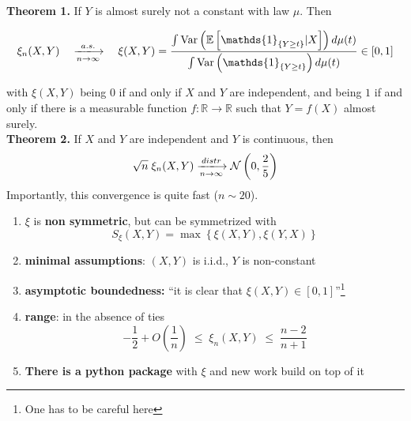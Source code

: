\documentclass[a4paper, 10pt]{beamer}
\newcommand{\Var}[1]{\text{Var}\left(#1\right)}
\newcommand{\E}[1]{\mathbb{E}\left[#1\right]}
\newcommand{\CF}[1]{\mathds{1}_{#1}}
\begin{document}
\begin{frame}\footnotesize
  \textbf{Theorem 1.} If $Y$ is almost surely not a constant with law $\mu$.
  Then

  \begin{equation*}
    \xi_n(X,Y) \quad \xlongrightarrow[n \to \infty]{a.s.} \quad \xi(X,Y) = \frac{\int
    \Var{\E{\CF{\{Y \geq t\}}|X}}d\mu(t)}{\int \Var{\CF{\{Y \geq t\}}}d\mu(t)}
    \in [0,1]
  \end{equation*}

  with $\xi(X,Y)$ being $0$ if and only if $X$ and $Y$ are independent, and
  being $1$ if and only if there is a measurable function $f : \mathbb{R} \to
  \mathbb{R}$ such that $Y = f(X)$ almost surely.\\[20pt]

  \textbf{Theorem 2.} If $X$ and $Y$ are independent and $Y$ is
  continuous, then
  \begin{equation*}
    \sqrt{n} \; \xi_n(X,Y) \xlongrightarrow[n\to\infty]{distr} \mathcal{N}\left(0,\frac{2}{5}\right)
  \end{equation*}
  Importantly, this convergence is quite fast ($n \sim 20$).
\end{frame}

\begin{frame}\small
  \begin{enumerate}
    \item $\xi$ is \textbf{non symmetric}, but can be symmetrized with
      \begin{equation*}
        S_{\xi}(X,Y) = \max\left\{\xi(X,Y),\xi(Y,X)\right\}
      \end{equation*}
    \item \textbf{minimal assumptions}: $(X,Y)$ is i.i.d., $Y$ is non-constant
    \item \textbf{asymptotic boundedness:} ``it is clear that $\xi(X,Y) \in
      [0,1]$''\footnote{One has to be careful here} 
    \item \textbf{range}: in the absence of ties
      \begin{equation*}
        -\frac{1}{2} + O\left(\frac{1}{n}\right) \;\leq \; \xi_n(X,Y) \; \leq \;
        \frac{n-2}{n+1}
      \end{equation*}
    \item \textbf{There is a python package} with $\xi$ and new work build on
      top of it
  \end{enumerate}
\end{frame}
\end{document}
